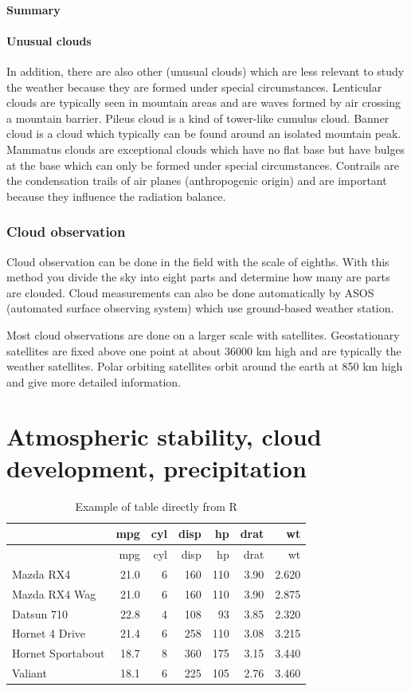\documentclass[oneside]{book}
\begin{document}
\subsubsection{Summary}\label{summary}

\subsubsection{Unusual clouds}\label{unusual-clouds}

In addition, there are also other (unusual clouds) which are less
relevant to study the weather because they are formed under special
circumstances. Lenticular clouds are typically seen in mountain areas
and are waves formed by air crossing a mountain barrier. Pileus cloud is
a kind of tower-like cumulus cloud. Banner cloud is a cloud which
typically can be found around an isolated mountain peak. Mammatus clouds
are exceptional clouds which have no flat base but have bulges at the
base which can only be formed under special circumstances. Contrails are
the condensation trails of air planes (anthropogenic origin) and are
important because they influence the radiation balance.

\subsection{Cloud observation}\label{cloud-observation}

Cloud observation can be done in the field with the scale of eighths.
With this method you divide the sky into eight parts and determine how
many are parts are clouded. Cloud measurements can also be done
automatically by ASOS (automated surface observing system) which use
ground-based weather station.

Most cloud observations are done on a larger scale with satellites.
Geostationary satellites are fixed above one point at about 36000 km
high and are typically the weather satellites. Polar orbiting satellites
orbit around the earth at 850 km high and give more detailed
information.

\chapter{Atmospheric stability, cloud development,
precipitation}\label{atmospheric-stability-cloud-development-precipitation}


\begin{longtable}[]{@{}lrrrrrr@{}}
\caption{\label{tab:unnamed-chunk-1}Example of table directly from
R}\tabularnewline
\toprule
& mpg & cyl & disp & hp & drat & wt\tabularnewline
\midrule
\endfirsthead
\toprule
& mpg & cyl & disp & hp & drat & wt\tabularnewline
\midrule
\endhead
Mazda RX4 & 21.0 & 6 & 160 & 110 & 3.90 & 2.620\tabularnewline
Mazda RX4 Wag & 21.0 & 6 & 160 & 110 & 3.90 & 2.875\tabularnewline
Datsun 710 & 22.8 & 4 & 108 & 93 & 3.85 & 2.320\tabularnewline
Hornet 4 Drive & 21.4 & 6 & 258 & 110 & 3.08 & 3.215\tabularnewline
Hornet Sportabout & 18.7 & 8 & 360 & 175 & 3.15 & 3.440\tabularnewline
Valiant & 18.1 & 6 & 225 & 105 & 2.76 & 3.460\tabularnewline
\bottomrule
\end{longtable}
\end{document}
